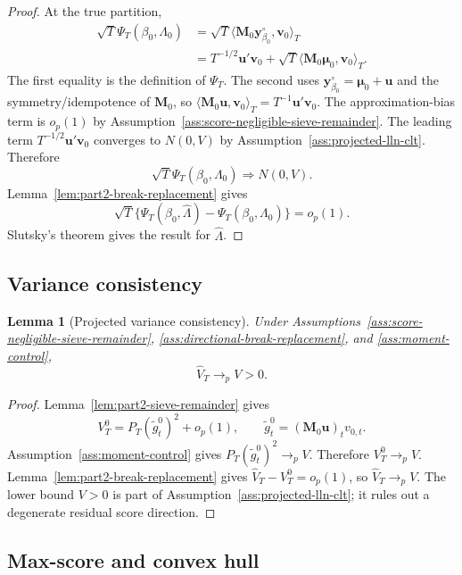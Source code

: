 \documentclass[12pt]{article}
\numberwithin{equation}{section}
\newtheorem{lemma}{Lemma}
\theoremstyle{definition}
\newcommand{\op}{o_p}
\newcommand{\innerT}[2]{\langle #1,#2\rangle_T}
\begin{document}
\begin{proof}
At the true partition,
\[
\begin{aligned}
    \sqrt T\Psi_T(\beta_0,\Lambda_0)
    &=\sqrt T\innerT{\bm M_0\bm y_{\beta_0}^\circ}{\bm v_0} \\
    &=T^{-1/2}\bm u'\bm v_0
      +\sqrt T\innerT{\bm M_0\bm\mu_0}{\bm v_0}.
\end{aligned}
\]
The first equality is the definition of \(\Psi_T\). The second uses
\(\bm y_{\beta_0}^\circ=\bm\mu_0+\bm u\) and the symmetry/idempotence of
\(\bm M_0\), so \(\innerT{\bm M_0\bm u}{\bm v_0}=T^{-1}\bm u'\bm v_0\).
The approximation-bias term is \(\op(1)\) by
Assumption~\ref{ass:score-negligible-sieve-remainder}. The leading term
\(T^{-1/2}\bm u'\bm v_0\) converges to \(N(0,V)\) by
Assumption~\ref{ass:projected-lln-clt}. Therefore
\[
    \sqrt T\Psi_T(\beta_0,\Lambda_0)\Rightarrow N(0,V).
\]
Lemma~\ref{lem:part2-break-replacement} gives
\[
    \sqrt T\{
    \Psi_T(\beta_0,\widehat\Lambda)-\Psi_T(\beta_0,\Lambda_0)
    \}=\op(1).
\]
Slutsky's theorem gives the result for \(\widehat\Lambda\).
\end{proof}

\subsection{Variance consistency}

\begin{lemma}[Projected variance consistency]
\label{lem:part2-variance-consistency}
Under Assumptions~\ref{ass:score-negligible-sieve-remainder},
\ref{ass:directional-break-replacement}, and \ref{ass:moment-control},
\[
    \widehat V_T\to_p V>0.
\]
\end{lemma}

\begin{proof}
Lemma~\ref{lem:part2-sieve-remainder} gives
\[
    V_T^0=P_T(\tilde g_t^0)^2+\op(1),
    \qquad
    \tilde g_t^0=(\bm M_0\bm u)_tv_{0,t}.
\]
Assumption~\ref{ass:moment-control} gives \(P_T(\tilde g_t^0)^2\to_p V\).
Therefore \(V_T^0\to_p V\). Lemma~\ref{lem:part2-break-replacement} gives
\(\widehat V_T-V_T^0=\op(1)\), so \(\widehat V_T\to_p V\). The lower bound
\(V>0\) is part of Assumption~\ref{ass:projected-lln-clt}; it rules out a
degenerate residual score direction.
\end{proof}

\subsection{Max-score and convex hull}
\end{document}

